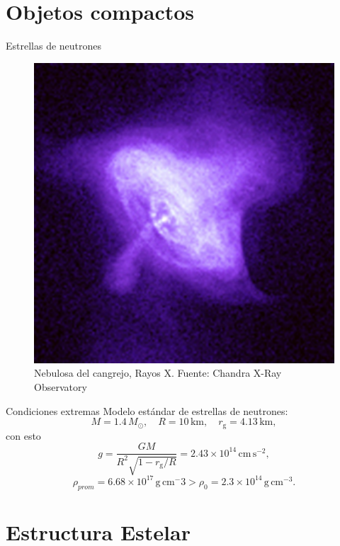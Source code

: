 \documentclass[11pt]{beamer}
\begin{document}
\section{Objetos compactos}
\begin{frame}{Estrellas de neutrones}
    \begin{figure}
        \centering
        \includegraphics[width=0.6\linewidth]{crab.png}
        \caption{ Nebulosa del cangrejo, Rayos X. Fuente: Chandra X-Ray Observatory}
    \end{figure}
\end{frame}

\begin{frame}{Condiciones extremas}
    Modelo estándar de estrellas de neutrones:
    \begin{equation}
        M = 1.4 \,M _ { \odot },\quad R = 10 \,\mathrm { km }, \quad r_{\mathrm{g}}=4.13\,\mathrm{km},
    \end{equation}
    con esto
    \begin{equation}
        g = \frac{ G M }{ R^2\sqrt { 1 - r_{\mathrm{g}} / R }}=2.43 \times 10 ^ { 14 }\, \mathrm { cm\,s } ^ { - 2 },
    \end{equation}
    \begin{equation}
        \rho_{prom}=6.68\times 10^{17}\,\mathrm{g}\, \mathrm{cm^-3} > \rho_0= 2.3 \times 10^{14}\,\mathrm{g}\, \mathrm{cm^{-3}}.
    \end{equation}
\end{frame}

\section{Estructura Estelar}
\end{document}
